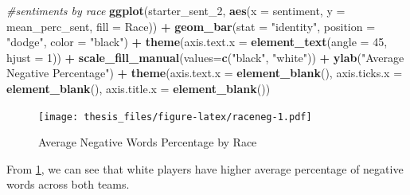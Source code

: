 \documentclass[12pt,twoside]{reedthesis}
\newenvironment{Shaded}{\begin{snugshade}}{\end{snugshade}}
\newcommand{\KeywordTok}[1]{\textcolor[rgb]{0.13,0.29,0.53}{\textbf{#1}}}
\newcommand{\DataTypeTok}[1]{\textcolor[rgb]{0.13,0.29,0.53}{#1}}
\newcommand{\DecValTok}[1]{\textcolor[rgb]{0.00,0.00,0.81}{#1}}
\newcommand{\StringTok}[1]{\textcolor[rgb]{0.31,0.60,0.02}{#1}}
\newcommand{\CommentTok}[1]{\textcolor[rgb]{0.56,0.35,0.01}{\textit{#1}}}
\newcommand{\OperatorTok}[1]{\textcolor[rgb]{0.81,0.36,0.00}{\textbf{#1}}}
\newcommand{\NormalTok}[1]{#1}
\begin{document}
\small
\begin{Shaded}
\begin{Highlighting}[]
\CommentTok{#sentiments by race}
\KeywordTok{ggplot}\NormalTok{(starter_sent_}\DecValTok{2}\NormalTok{, }\KeywordTok{aes}\NormalTok{(}\DataTypeTok{x =}\NormalTok{ sentiment, }\DataTypeTok{y =}\NormalTok{ mean_perc_sent, }
                           \DataTypeTok{fill =}\NormalTok{ Race)) }\OperatorTok{+}
\StringTok{  }\KeywordTok{geom_bar}\NormalTok{(}\DataTypeTok{stat =} \StringTok{"identity"}\NormalTok{, }\DataTypeTok{position =} \StringTok{"dodge"}\NormalTok{, }\DataTypeTok{color =} \StringTok{"black"}\NormalTok{) }\OperatorTok{+}
\StringTok{  }\KeywordTok{theme}\NormalTok{(}\DataTypeTok{axis.text.x =} \KeywordTok{element_text}\NormalTok{(}\DataTypeTok{angle =} \DecValTok{45}\NormalTok{, }\DataTypeTok{hjust =} \DecValTok{1}\NormalTok{)) }\OperatorTok{+}
\StringTok{  }\KeywordTok{scale_fill_manual}\NormalTok{(}\DataTypeTok{values=}\KeywordTok{c}\NormalTok{(}\StringTok{"black"}\NormalTok{, }\StringTok{"white"}\NormalTok{)) }\OperatorTok{+}
\StringTok{  }\KeywordTok{ylab}\NormalTok{(}\StringTok{"Average Negative Percentage"}\NormalTok{) }\OperatorTok{+}
\StringTok{  }\KeywordTok{theme}\NormalTok{(}\DataTypeTok{axis.text.x =} \KeywordTok{element_blank}\NormalTok{(), }
        \DataTypeTok{axis.ticks.x =} \KeywordTok{element_blank}\NormalTok{(), }
        \DataTypeTok{axis.title.x =} \KeywordTok{element_blank}\NormalTok{())}
\end{Highlighting}
\end{Shaded}
\begin{figure}
\centering
\texttt{[image: thesis\_files/figure-latex/raceneg-1.pdf]}
\caption{\label{fig:raceneg}Average Negative Words Percentage by Race}
\end{figure}
\normalsize

From \ref{fig:raceneg}, we can see that white players have higher
average percentage of negative words across both teams.
\end{document}
